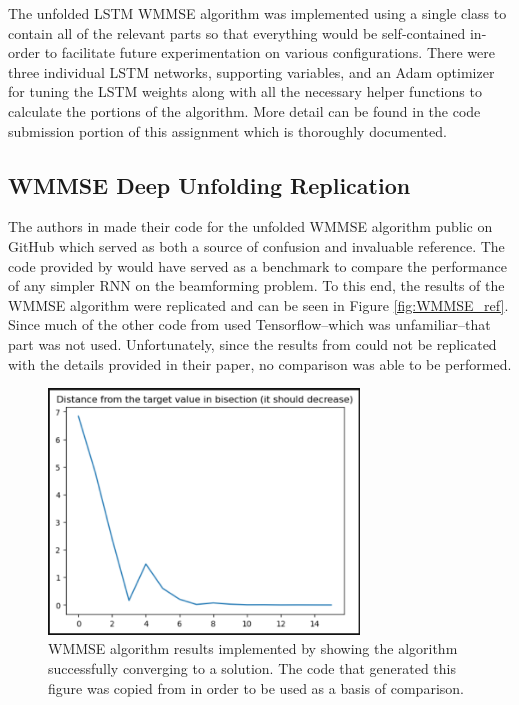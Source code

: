 \documentclass[journal]{IEEEtran}
\begin{document}
The unfolded LSTM WMMSE algorithm was implemented using a single class to contain all of the relevant parts so that everything would be self-contained in-order to facilitate future experimentation on various configurations. There were three individual LSTM networks, supporting variables, and an Adam optimizer for tuning the LSTM weights along with all the necessary helper functions to calculate the portions of the algorithm. More detail can be found in the code submission portion of this assignment which is thoroughly documented.

\subsection{WMMSE Deep Unfolding Replication}
The authors in \cite{Deep_Unfolding} made their code for the unfolded WMMSE algorithm public on GitHub which served as both a source of confusion and invaluable reference. The code provided by \cite{Deep_Unfolding} would have served as a benchmark to compare the performance of any simpler RNN on the beamforming problem. To this end, the results of the WMMSE algorithm were replicated and can be seen in Figure \ref{fig:WMMSE_ref}. Since much of the other code from \cite{Deep_Unfolding} used Tensorflow--which was unfamiliar--that part was not used. Unfortunately, since the results from \cite{LSTM_Net} could not be replicated with the details provided in their paper, no comparison was able to be performed.

\begin{figure}[h]%
\includegraphics[width=3.25in]{assets/WMMSE_Working_Other_Peeps.png}%
\caption{WMMSE algorithm results implemented by \cite{Deep_Unfolding} showing the algorithm successfully converging to a solution. The code that generated this figure was copied from \cite{Deep_Unfolding} in order to be used as a basis of comparison.}%
\label{fig:WMMSE_Working}%
\end{figure}
\end{document}

